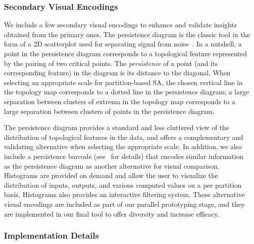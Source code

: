 \subsubsection{Secondary Visual Encodings}
\label{sec:otherViews}
We include a few secondary visual encodings to enhance and validate insights obtained from the primary ones.
%
The persistence diagram is the classic tool in the form of a 2D scatterplot used for separating signal from noise~\cite{EdelsbrunnerHarer2008}.
%
In a nutshell, a point in the persistence diagram corresponds to a topological feature represented by the pairing of two critical points. 
%
The \emph{persistence} of a point (and its corresponding feature) in the diagram is  its distance to the diagonal.
%
When selecting an appropriate scale for partition-based SA, the chosen vertical line in the topology map corresponds to a dotted line in the persistence diagram; a large separation between clusters of extrema in the topology map corresponds to a large separation between clusters of points in the persistence diagram.

The persistence diagram provides a standard and less cluttered view of the distribution of topological features in the data, and offers a complementary and validating alternative when selecting the appropriate scale.
%
In addition, we also include a persistence
barcode (see~\cite{CarlssonZomorodianCollins2004} for details) that encodes similar information as the persistence diagram as another alternative for visual comparison.
%
Histograms are provided on demand and allow the user to visualize the distribution of inputs, outputs, and various computed values on a per partition basis.
%
Histograms also provides an interactive filtering system.
%
These alternative visual encodings are included as part of our parallel prototyping stage, and they are implemented in our final tool to offer diversity and increase efficacy.

\subsubsection{Implementation Details}

